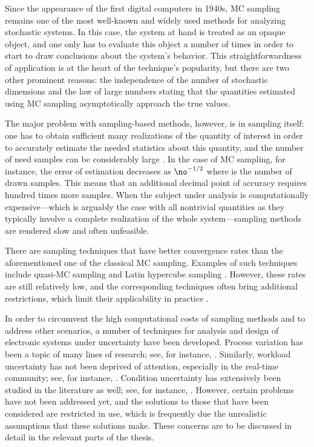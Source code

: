 Since the appearance of the first digital computers in 1940s, \ac{MC} sampling
remains one of the most well-known and widely used methods for analyzing
stochastic systems. In this case, the system at hand is treated as an opaque
object, and one only has to evaluate this object a number of times in order to
start to draw conclusions about the system's behavior. This straightforwardness
of application is at the heart of the technique's popularity, but there are two
other prominent reasons: the independence of the number of stochastic dimensions
and the law of large numbers \cite{durrett2010} stating that the quantities
estimated using \ac{MC} sampling asymptotically approach the true values.

The major problem with sampling-based methods, however, is in sampling itself:
one has to obtain sufficient many realizations of the quantity of interest in
order to accurately estimate the needed statistics about this quantity, and the
number of need samples can be considerably large \cite{diaz-emparanza2002}. In
the case of \ac{MC} sampling, for instance, the error of estimation decreases as
$\no^{-1/2}$ where \no is the number of drawn samples. This means that an
additional decimal point of accuracy requires hundred times more samples. When
the subject under analysis is computationally expensive---which is arguably the
case with all nontrivial quantities as they typically involve a complete
realization of the whole system---sampling methods are rendered slow and often
unfeasible.

There are sampling techniques that have better convergence rates than the
aforementioned one of the classical \ac{MC} sampling. Examples of such
techniques include quasi-\ac{MC} sampling and Latin hypercube sampling
\cite{asmussen2007}. However, these rates are still relatively low, and the
corresponding techniques often bring additional restrictions, which limit their
applicability in practice \cite{xiu2010}.

In order to circumvent the high computational costs of sampling methods and to
address other scenarios, a number of techniques for analysis and design of
electronic systems under uncertainty have been developed. Process variation has
been a topic of many lines of research; see, for instance, \cite{bhardwaj2006,
bhardwaj2008, chandra2010, juan2012, lee2013}. Similarly, workload uncertainty
has not been deprived of attention, especially in the real-time community; see,
for instance, \cite{diaz2002, santinelli2011, quinton2012, tanasa2015}.
Condition uncertainty has extensively been studied in the literature as well;
see, for instance, \cite{coskun2006, huang2009b, das2014c}. However, certain
problems have not been addressed yet, and the solutions to those that have been
considered are restricted in use, which is frequently due the unrealistic
assumptions that these solutions make. These concerns are to be discussed in
detail in the relevant parts of the thesis.
